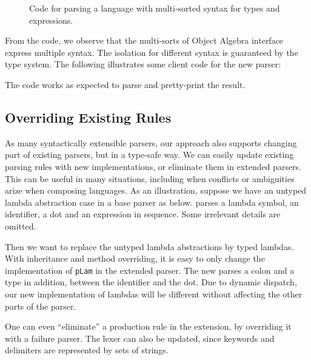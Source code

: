 \begin{figure}[ht]
\caption{Code for parsing a language with multi-sorted syntax for types and expressions.}
\label{fig:multi}
\end{figure}

From the code, we observe that the multi-sorts of Object Algebra interface
express multiple syntax. The isolation for different syntax
is guaranteed by the type system. The following illustrates some client code
for the new parser:

The code works as expected to parse and pretty-print the result.

\subsection{Overriding Existing Rules}\label{subsec:overriding-rules}

As many syntactically extensible parsers, our approach also supports
changing part of existing parsers, but in a type-safe way. We can
easily update existing parsing rules with new implementations, or
eliminate them in extended parsers. This can be useful in many
situations, including when conflicts or ambiguities arize when
composing languages.
As an illustration, suppose we have an untyped lambda abstraction case in a base parser as below.  parses a lambda symbol, an identifier, a dot and an expression in sequence. Some irrelevant details are omitted.


Then we want to replace the untyped lambda abstractions by typed
lambdas. With inheritance and method overriding, it is easy to only
change the implementation of \lstinline{pLam} in the extended parser.
The new  parses a colon and a type in addition,
between the identifier and the dot. Due to dynamic dispatch, our new
implementation of lambdas will be different without affecting the other parts of the parser.



One can even ``eliminate'' a production rule in the extension, by overriding it with a failure parser. The lexer can also be updated, since keywords and delimiters are represented by sets of strings.

